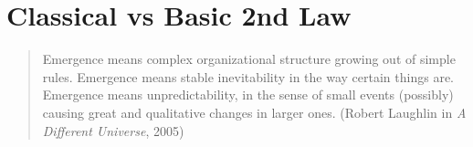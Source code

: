 


 















\chapter{Classical vs Basic 2nd Law}

\small

\begin{quote} Emergence means complex organizational structure growing out
of simple rules. Emergence means stable inevitability in the way certain
things are. Emergence means unpredictability, in the sense of small events
(possibly) causing great and qualitative changes in larger ones. 
(Robert Laughlin in \emph{A Different Universe},
2005)
\end{quote}

